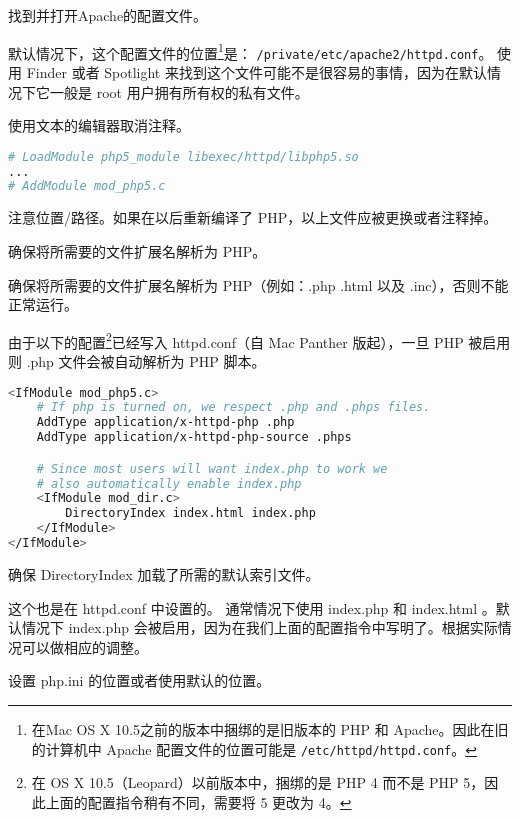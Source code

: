\begin{compactenum}
\item 找到并打开Apache的配置文件。

默认情况下，这个配置文件的位置\footnote{在Mac OS X 10.5之前的版本中捆绑的是旧版本的 PHP 和 Apache。因此在旧的计算机中 Apache 配置文件的位置可能是 \texttt{/etc/httpd/httpd.conf}。}是： \texttt{/private/etc/apache2/httpd.conf}。 使用 Finder 或者 Spotlight 来找到这个文件可能不是很容易的事情，因为在默认情况下它一般是 root 用户拥有所有权的私有文件。

\item 使用文本的编辑器取消注释。

\begin{lstlisting}[language=bash]
# LoadModule php5_module libexec/httpd/libphp5.so
...
# AddModule mod_php5.c
\end{lstlisting}

注意位置/路径。如果在以后重新编译了 PHP，以上文件应被更换或者注释掉。

\item 确保将所需要的文件扩展名解析为 PHP。

确保将所需要的文件扩展名解析为 PHP（例如：.php .html 以及 .inc），否则不能正常运行。

由于以下的配置\footnote{在 OS X 10.5（Leopard）以前版本中，捆绑的是 PHP 4 而不是 PHP 5，因此上面的配置指令稍有不同，需要将 5 更改为 4。}已经写入 httpd.conf（自 Mac Panther 版起），一旦 PHP 被启用则 .php 文件会被自动解析为 PHP 脚本。

\begin{lstlisting}[language=bash]
<IfModule mod_php5.c>
    # If php is turned on, we respect .php and .phps files.
    AddType application/x-httpd-php .php
    AddType application/x-httpd-php-source .phps

    # Since most users will want index.php to work we
    # also automatically enable index.php
    <IfModule mod_dir.c>
        DirectoryIndex index.html index.php
    </IfModule>
</IfModule>
\end{lstlisting}

\item 确保 DirectoryIndex 加载了所需的默认索引文件。

这个也是在 httpd.conf 中设置的。 通常情况下使用 index.php 和 index.html 。默认情况下 index.php 会被启用，因为在我们上面的配置指令中写明了。根据实际情况可以做相应的调整。

\item 设置 php.ini 的位置或者使用默认的位置。


\end{compactenum}
